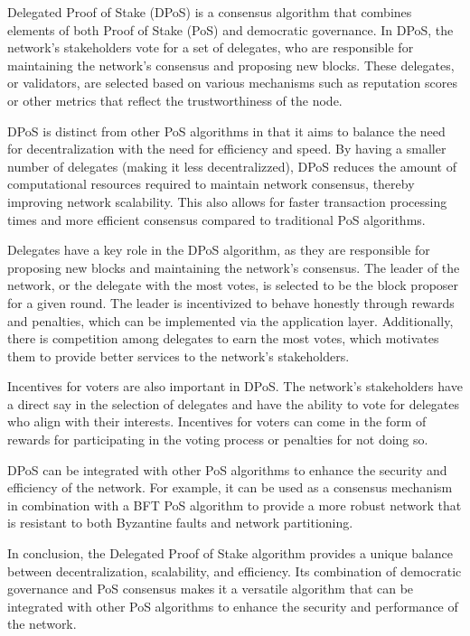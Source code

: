 Delegated Proof of Stake (DPoS) is a consensus algorithm that combines elements of both Proof of Stake (PoS) and democratic governance. In DPoS, the network's stakeholders vote for a set of delegates, who are responsible for maintaining the network's consensus and proposing new blocks. These delegates, or validators, are selected based on various mechanisms such as reputation scores or other metrics that reflect the trustworthiness of the node.

DPoS is distinct from other PoS algorithms in that it aims to balance the need for decentralization with the need for efficiency and speed. By having a smaller number of delegates (making it less decentralizzed), DPoS reduces the amount of computational resources required to maintain network consensus, thereby improving network scalability. This also allows for faster transaction processing times and more efficient consensus compared to traditional PoS algorithms.

Delegates have a key role in the DPoS algorithm, as they are responsible for proposing new blocks and maintaining the network's consensus. The leader of the network, or the delegate with the most votes, is selected to be the block proposer for a given round. The leader is incentivized to behave honestly through rewards and penalties, which can be implemented via the application layer. Additionally, there is competition among delegates to earn the most votes, which motivates them to provide better services to the network's stakeholders.

Incentives for voters are also important in DPoS. The network's stakeholders have a direct say in the selection of delegates and have the ability to vote for delegates who align with their interests. Incentives for voters can come in the form of rewards for participating in the voting process or penalties for not doing so.

DPoS can be integrated with other PoS algorithms to enhance the security and efficiency of the network. For example, it can be used as a consensus mechanism in combination with a BFT PoS algorithm to provide a more robust network that is resistant to both Byzantine faults and network partitioning.

In conclusion, the Delegated Proof of Stake algorithm provides a unique balance between decentralization, scalability, and efficiency. Its combination of democratic governance and PoS consensus makes it a versatile algorithm that can be integrated with other PoS algorithms to enhance the security and performance of the network.

